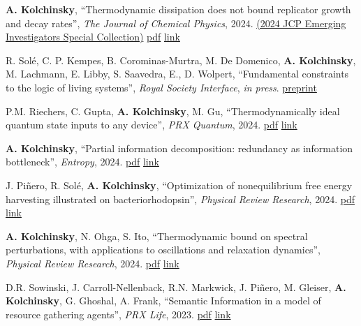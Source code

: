 
\newcommand{\pdflink}[1]{\href{https://artemyk.github.io/assets/pdf/papers/#1.pdf}{pdf}}
\newcommand{\publink}[1]{\href{#1}{link}}

\textbf{A. Kolchinsky}, ``Thermodynamic dissipation does not bound replicator growth and decay rates'', \emph{The Journal of Chemical Physics}, 2024.  \href{https://publishing.aip.org/publications/journals/special-topics/jcp/2024-jcp-emerging-investigators-special-collection/}{(2024 JCP Emerging Investigators Special Collection)} \pdflink{Kolchinsky_ThermodynamicDissipation_JCP_2024} \publink{https://pubs.aip.org/aip/jcp/article-abstract/161/12/124101/3313575/Thermodynamic-dissipation-does-not-bound}

R. Solé, C. P. Kempes, B. Corominas-Murtra, M. De Domenico, \textbf{A. Kolchinsky}, M. Lachmann, E. Libby, S. Saavedra, E., D. Wolpert, ``Fundamental constraints to the logic of living systems'', \emph{Royal Society Interface}, \emph{in press}. \href{https://www.preprints.org/manuscript/202406.0891/v1}{preprint}

P.M. Riechers, C. Gupta, \textbf{A. Kolchinsky}, M. Gu, ``Thermodynamically ideal quantum state inputs to any device'', \emph{PRX Quantum}, 2024. \pdflink{Riechers_2024_ThermodynamicallyIdealInputs} \publink{https://journals.aps.org/prxquantum/abstract/10.1103/PRXQuantum.5.030318}

\textbf{A. Kolchinsky}, ``Partial information decomposition: redundancy as information bottleneck'', \emph{Entropy}, 2024. \pdflink{Kolchinsky_2024_PIDasIB} \publink{https://www.mdpi.com/1099-4300/26/7/546}

J. Piñero, R. Solé, \textbf{A. Kolchinsky}, ``Optimization of nonequilibrium free energy harvesting illustrated on bacteriorhodopsin'', \emph{Physical Review Research}, 2024. \pdflink{Pinero_Sole_Kolchinsky_2024_OptimizationOfFreeEnergyHarvesting} \publink{https://journals.aps.org/prresearch/abstract/10.1103/PhysRevResearch.6.013275}

\textbf{A. Kolchinsky}, N. Ohga, S. Ito, ``Thermodynamic bound on spectral perturbations, with applications to oscillations and relaxation dynamics'', \emph{Physical Review Research}, 2024. \pdflink{Kolchinsky_Ohga_Ito_ThermodynamicBoundOnSpectralPerturbations} \publink{https://journals.aps.org/prresearch/pdf/10.1103/PhysRevResearch.6.013082}

D.R. Sowinski, J. Carroll-Nellenback, R.N. Markwick, J. Piñero, M. Gleiser, \textbf{A. Kolchinsky}, G. Ghoshal, A. Frank, ``Semantic Information in a model of resource gathering agents'', \emph{PRX Life}, 2023. \pdflink{Sowinski-SemanticInformationInAModelOfResourceGatheringAgents} \publink{https://journals.aps.org/prxlife/abstract/10.1103/PRXLife.1.023003}

